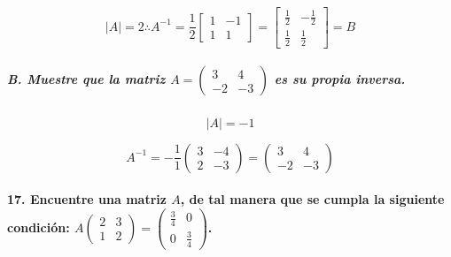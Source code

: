 \documentclass[
]{article}
\begin{document}
\[
|A| = 2 \therefore A^{-1} = \frac{1}{2}\begin{bmatrix}
    1&-1\\1&1
\end{bmatrix} = \begin{bmatrix}
    \frac{1}{2} & -\frac{1}{2} \\
    \frac{1}{2} & \frac{1}{2}
\end{bmatrix} = B
\]

\hypertarget{b.-muestre-que-la-matriz-a-beginpmatrix34-2-3endpmatrix-es-su-propia-inversa.}{%
\subparagraph{\texorpdfstring{B. Muestre que la matriz
\(A = \begin{pmatrix}3&4\\-2&-3\end{pmatrix}\) es su propia
inversa.}{B. Muestre que la matriz A = \textbackslash begin\{pmatrix\}3\&4\textbackslash\textbackslash-2\&-3\textbackslash end\{pmatrix\} es su propia inversa.}}\label{b.-muestre-que-la-matriz-a-beginpmatrix34-2-3endpmatrix-es-su-propia-inversa.}}

\[
|A| = -1
\]

\[
A^{-1} = -\frac{1}{1}\begin{pmatrix}3&-4\\2&-3\end{pmatrix} = \begin{pmatrix}3&4\\-2&-3\end{pmatrix}
\]

\hypertarget{encuentre-una-matriz-a-de-tal-manera-que-se-cumpla-la-siguiente-condiciuxf3n-abeginpmatrix2312endpmatrix-beginpmatrixfrac34-0-0-frac34endpmatrix.}{%
\paragraph{\texorpdfstring{17. Encuentre una matriz \(A\), de tal manera
que se cumpla la siguiente condición:
\(A\begin{pmatrix}2&3\\1&2\end{pmatrix} = \begin{pmatrix}\frac{3}{4} & 0 \\ 0 & \frac{3}{4}\end{pmatrix}\).}{17. Encuentre una matriz A, de tal manera que se cumpla la siguiente condición: A\textbackslash begin\{pmatrix\}2\&3\textbackslash\textbackslash1\&2\textbackslash end\{pmatrix\} = \textbackslash begin\{pmatrix\}\textbackslash frac\{3\}\{4\} \& 0 \textbackslash\textbackslash{} 0 \& \textbackslash frac\{3\}\{4\}\textbackslash end\{pmatrix\}.}}\label{encuentre-una-matriz-a-de-tal-manera-que-se-cumpla-la-siguiente-condiciuxf3n-abeginpmatrix2312endpmatrix-beginpmatrixfrac34-0-0-frac34endpmatrix.}}
\end{document}
